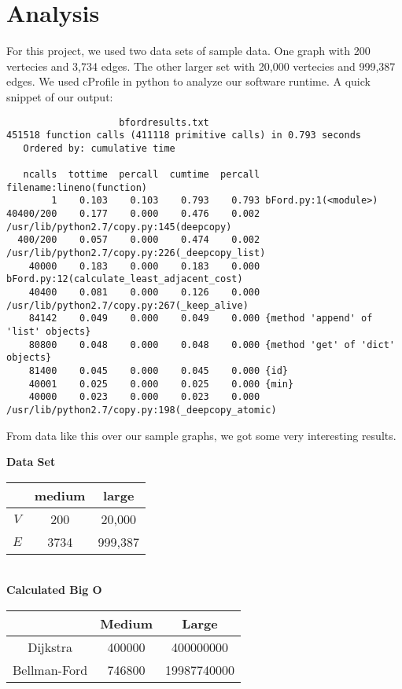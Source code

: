 \documentclass{article}
\begin{document}
\section{Analysis}
For this project, we used two data sets of sample data. One graph with 200 vertecies and 3,734 edges. The other larger set with 20,000 vertecies and 999,387 edges. We used cProfile in python to analyze our software runtime. A quick snippet of our output:
\begin{verbatim}
                    bfordresults.txt
451518 function calls (411118 primitive calls) in 0.793 seconds
   Ordered by: cumulative time

   ncalls  tottime  percall  cumtime  percall filename:lineno(function)
        1    0.103    0.103    0.793    0.793 bFord.py:1(<module>)
40400/200    0.177    0.000    0.476    0.002 /usr/lib/python2.7/copy.py:145(deepcopy)
  400/200    0.057    0.000    0.474    0.002 /usr/lib/python2.7/copy.py:226(_deepcopy_list)
    40000    0.183    0.000    0.183    0.000 bFord.py:12(calculate_least_adjacent_cost)
    40400    0.081    0.000    0.126    0.000 /usr/lib/python2.7/copy.py:267(_keep_alive)
    84142    0.049    0.000    0.049    0.000 {method 'append' of 'list' objects}
    80800    0.048    0.000    0.048    0.000 {method 'get' of 'dict' objects}
    81400    0.045    0.000    0.045    0.000 {id}
    40001    0.025    0.000    0.025    0.000 {min}
    40000    0.023    0.000    0.023    0.000 /usr/lib/python2.7/copy.py:198(_deepcopy_atomic)
\end{verbatim}

From data like this over our sample graphs, we got some very interesting results. \\

\begin{multicols}{2}

\hspace{20 pt} \textbf{Data Set}\\
\centering
\begin{tabular}{||c|c|c||}
\hline
& medium & large \\
\hline
$V$ & 200 & 20,000\\
\hline
$E$ & 3734 & 999,387\\
\hline
\end{tabular}\\

\hspace{5 pt} \textbf{Calculated Big O}\\
\centering
\begin{tabular}{||c|c|c||}
\hline
& Medium & Large \\
\hline
Dijkstra & 400000 &400000000\\
\hline
Bellman-Ford & 746800  & 19987740000\\
\hline
\end{tabular}

\end{multicols}
\end{document}
